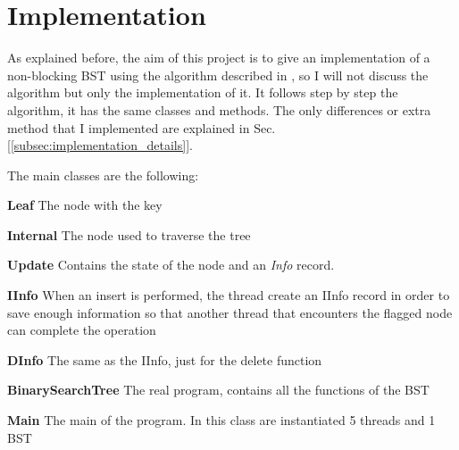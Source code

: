 \documentclass[a4paper]{article}
\begin{document}

\section{Implementation} %
\label{sec:implementation}
As explained before, the aim of this project is to give an implementation of a non-blocking \ac{BST} using the algorithm described in \cite{algorithm}, so I will not discuss the algorithm but only the implementation of it.
It follows step by step the algorithm, it has the same classes and methods. The only differences or extra method that I implemented are explained in Sec.[\ref{subsec:implementation_details}].

\noindent
The main classes are the following:
\begin{compactitem}
  \item \textbf{Leaf} The node with the key
  \item \textbf{Internal} The node used to traverse the tree
  \item \textbf{Update} Contains the state of the node and an \emph{Info} record.
  \item \textbf{IInfo} When an insert is performed, the thread create an IInfo record in order to save enough information so that another thread that encounters the flagged node can complete the operation
  \item \textbf{DInfo} The same as the IInfo, just for the delete function
  \item \textbf{BinarySearchTree} The real program, contains all the functions of the \ac{BST}
  \item \textbf{Main} The main of the program. In this class are instantiated 5 threads and 1 \ac{BST}
\end{compactitem}
\end{document}
